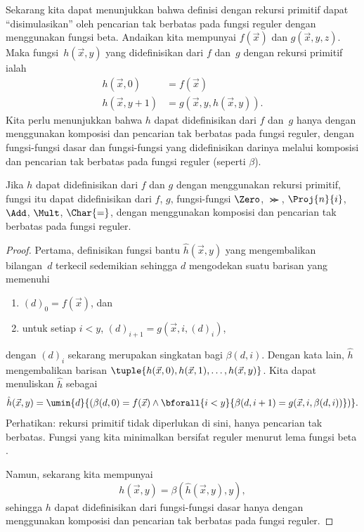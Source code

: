 \documentclass[../../../include/open-logic-section]{subfiles}
\begin{document}

Sekarang kita dapat menunjukkan bahwa definisi dengan rekursi primitif dapat
``disimulasikan'' oleh pencarian tak berbatas pada fungsi reguler dengan
menggunakan fungsi beta. Andaikan kita mempunyai $f(\vec x)$ dan
$g(\vec x, y, z)$. Maka fungsi~$h(\vec x,y)$ yang didefinisikan dari $f$
dan~$g$ dengan rekursi primitif ialah
\begin{align*}
h(\vec x, 0) & =  f(\vec x) \\
h(\vec x, y+1) & =  g(\vec x, y, h(\vec x, y)).
\end{align*}
Kita perlu menunjukkan bahwa $h$ dapat didefinisikan dari $f$ dan~$g$ hanya
dengan menggunakan komposisi dan pencarian tak berbatas pada fungsi reguler,
dengan fungsi-fungsi dasar dan fungsi-fungsi yang didefinisikan darinya
melalui komposisi dan pencarian tak berbatas pada fungsi reguler (seperti
$\beta$).

\begin{lem}
Jika $h$ dapat didefinisikan dari $f$ dan $g$ dengan menggunakan rekursi
primitif, fungsi itu dapat didefinisikan dari $f$, $g$, fungsi-fungsi $\Zero$,
$\Succ$, $\Proj{n}{i}$, $\Add$, $\Mult$, $\Char{=}$, dengan menggunakan
komposisi dan pencarian tak berbatas pada fungsi reguler.
\end{lem}

\begin{proof}
Pertama, definisikan fungsi bantu $\hat h(\vec x, y)$ yang mengembalikan
bilangan~$d$ terkecil sedemikian sehingga $d$ mengodekan suatu barisan yang
memenuhi
\begin{enumerate}
\item $(d)_0 = f(\vec x)$, dan
\item untuk setiap $i < y$, $(d)_{i+1} = g(\vec x, i, (d)_i)$,
\end{enumerate}
dengan $(d)_i$ sekarang merupakan singkatan bagi $\beta(d,i)$. Dengan kata
lain, $\hat h$ mengembalikan barisan
$\tuple{h(\vec x, 0), h(\vec x, 1), \dots, h(\vec x, y)}$. Kita dapat
menuliskan $\hat h$ sebagai
\[
\hat h(\vec x, y) = \umin{d}{(\beta(d,0) = f(\vec x) \land \bforall{i <
  y}{\beta(d,i+1) = g(\vec x, i,\beta(d,i))})}.
\]
Perhatikan: rekursi primitif tidak diperlukan di sini, hanya pencarian tak berbatas.
Fungsi yang kita minimalkan bersifat reguler menurut lema fungsi beta
.

Namun, sekarang kita mempunyai
\[
h(\vec x, y) = \beta(\hat h(\vec x, y), y),
\]
sehingga $h$ dapat didefinisikan dari fungsi-fungsi dasar hanya dengan
menggunakan komposisi dan pencarian tak berbatas pada fungsi reguler.
\end{proof}
\end{document}
